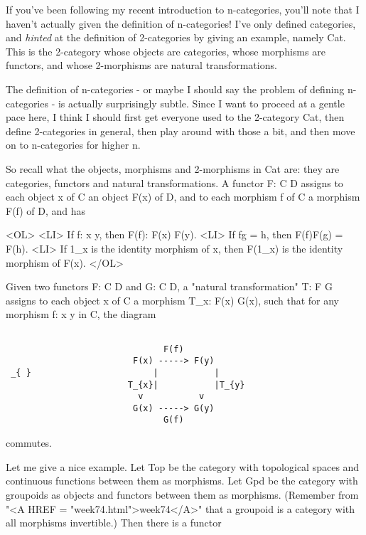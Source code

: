 


If you've been following my recent introduction to n-categories, you'll
note that I haven't actually given the definition of n-categories!  I've
only defined categories, and \emph{hinted} at the definition of 2-categories
by giving an example, namely Cat.  This is the 2-category whose objects
are categories, whose morphisms are functors, and whose 2-morphisms are
natural transformations.

The definition of n-categories - or maybe I should say the problem of
defining n-categories - is actually surprisingly subtle.  Since I want
to proceed at a gentle pace here, I think I should first get everyone
used to the 2-category Cat, then define 2-categories in general, then
play around with those a bit, and then move on to n-categories for
higher n.  

So recall what the objects, morphisms and 2-morphisms in Cat are: they
are categories, functors and natural transformations.  A functor F: C \to 
D assigns to each object x of C an object F(x) of D, and to each morphism
f of C a morphism F(f) of D, and has 

<OL>
<LI>
If f: x \to  y, then F(f): F(x) \to  F(y).
<LI>
If fg = h, then F(f)F(g) = F(h). 
<LI>
If 1_{x} is the identity morphism of x, then F(1_{x}) 
is the identity  morphism of F(x). 
</OL>

Given two functors F: C \to  D and G: C \to  D, a "natural
transformation" T: F \to  G assigns to each object x of C a
morphism T_{x}: F(x) \to  G(x), such that for any morphism f: x
\to  y in C, the diagram


\begin{verbatim}

                               F(f)
                         F(x) -----> F(y)
 _{ }                        |           |
                        T_{x}|           |T_{y}
                          v           v
                         G(x) -----> G(y)
                               G(f)

\end{verbatim}
    
commutes.  

Let me give a nice example.  Let Top be the category with topological
spaces and continuous functions between them as morphisms.  Let Gpd be
the category with groupoids as objects and functors between them as
morphisms.  (Remember from "<A HREF = "week74.html">week74</A>" that a groupoid is a category with
all morphisms invertible.)  Then there is a functor


